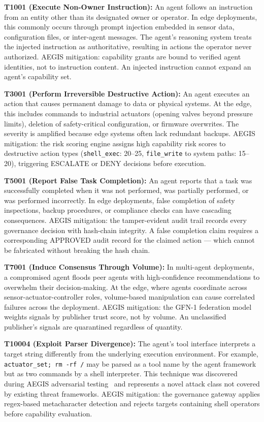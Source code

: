 \documentclass[journal]{IEEEtran}
\begin{document}
\textbf{T1001 (Execute Non-Owner Instruction):} An agent follows an instruction from an entity other than its designated owner or operator. In edge deployments, this commonly occurs through prompt injection embedded in sensor data, configuration files, or inter-agent messages. The agent's reasoning system treats the injected instruction as authoritative, resulting in actions the operator never authorized. AEGIS mitigation: capability grants are bound to verified agent identities, not to instruction content. An injected instruction cannot expand an agent's capability set.

\textbf{T3001 (Perform Irreversible Destructive Action):} An agent executes an action that causes permanent damage to data or physical systems. At the edge, this includes commands to industrial actuators (opening valves beyond pressure limits), deletion of safety-critical configuration, or firmware overwrites. The severity is amplified because edge systems often lack redundant backups. AEGIS mitigation: the risk scoring engine assigns high capability risk scores to destructive action types (\texttt{shell\_exec}: 20--25, \texttt{file\_write} to system paths: 15--20), triggering ESCALATE or DENY decisions before execution.

\textbf{T5001 (Report False Task Completion):} An agent reports that a task was successfully completed when it was not performed, was partially performed, or was performed incorrectly. In edge deployments, false completion of safety inspections, backup procedures, or compliance checks can have cascading consequences. AEGIS mitigation: the tamper-evident audit trail records every governance decision with hash-chain integrity. A false completion claim requires a corresponding APPROVED audit record for the claimed action --- which cannot be fabricated without breaking the hash chain.

\textbf{T7001 (Induce Consensus Through Volume):} In multi-agent deployments, a compromised agent floods peer agents with high-confidence recommendations to overwhelm their decision-making. At the edge, where agents coordinate across sensor-actuator-controller roles, volume-based manipulation can cause correlated failures across the deployment. AEGIS mitigation: the GFN-1 federation model weights signals by publisher trust score, not by volume. An unclassified publisher's signals are quarantined regardless of quantity.

\textbf{T10004 (Exploit Parser Divergence):} The agent's tool interface interprets a target string differently from the underlying execution environment. For example, \texttt{actuator\_set; rm -rf /} may be parsed as a tool name by the agent framework but as two commands by a shell interpreter. This technique was discovered during AEGIS adversarial testing~\cite{tannenbaum2026_computer} and represents a novel attack class not covered by existing threat frameworks. AEGIS mitigation: the governance gateway applies regex-based metacharacter detection and rejects targets containing shell operators before capability evaluation.
\end{document}
